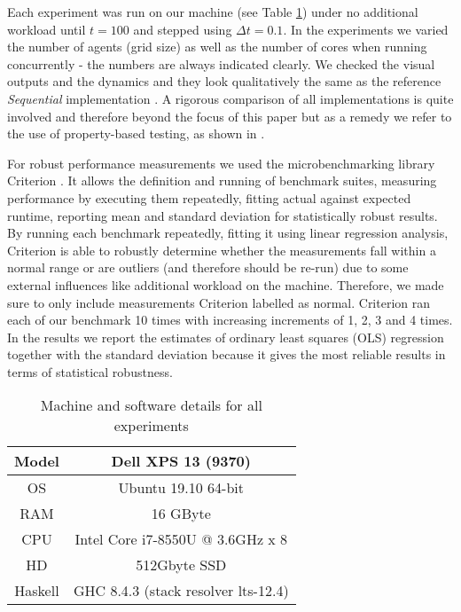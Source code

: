 Each experiment was run on our machine (see Table \ref{tab:machine_specs}) under no additional workload until $t = 100$ and stepped using $\Delta t = 0.1$. In the experiments we varied the number of agents (grid size) as well as the number of cores when running concurrently - the numbers are always indicated clearly. We checked the visual outputs and the dynamics and they look qualitatively the same as the reference \textit{Sequential} implementation \cite{thaler_pure_2018}. A rigorous comparison of all implementations is quite involved and therefore beyond the focus of this paper but as a remedy we refer to the use of property-based testing, as shown in \cite{thaler_show_2019}.

For robust performance measurements we used the microbenchmarking library Criterion \cite{criterion_serpentine, criterion_hackage}. It allows the definition and running of benchmark suites, measuring performance by executing them repeatedly, fitting actual against expected runtime, reporting mean and standard deviation for statistically robust results. By running each benchmark repeatedly, fitting it using linear regression analysis, Criterion is able to robustly determine whether the measurements fall within a normal range or are outliers (and therefore should be re-run) due to some external influences like additional workload on the machine. Therefore, we made sure to only include measurements Criterion labelled as normal. Criterion ran each of our benchmark 10 times with increasing increments of 1, 2, 3 and 4 times. In the results we report the estimates of ordinary least squares (OLS) regression together with the standard deviation because it gives the most reliable results in terms of statistical robustness.


\begin{table}
	\centering
	\begin{tabular}{ c || c }
		Model   & Dell XPS 13 (9370)				    \\ \hline
		OS      & Ubuntu 19.10 64-bit 				\\ \hline
		RAM     & 16 GByte 							\\ \hline
		CPU     & Intel Core i7-8550U @ 3.6GHz x 8 	\\ \hline
		HD      & 512Gbyte SSD 						\\ \hline
		Haskell & GHC 8.4.3 (stack resolver lts-12.4)
	\end{tabular}
	
	\caption{Machine and software details for all experiments}
	\label{tab:machine_specs}
\end{table}

